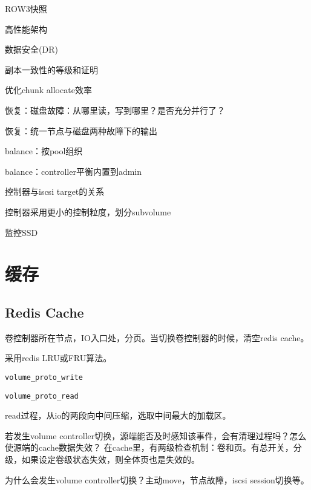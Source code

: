 \begin{enumbox}
\item ROW3快照
\item 高性能架构
\item 数据安全(DR)
\item 副本一致性的等级和证明
\item 优化chunk allocate效率
\item 恢复：磁盘故障：从哪里读，写到哪里？是否充分并行了？
\item 恢复：统一节点与磁盘两种故障下的输出
\item balance：按pool组织
\item balance：controller平衡内置到admin
\item 控制器与iscsi target的关系
\item 控制器采用更小的控制粒度，划分subvolume
\item 监控SSD
\end{enumbox}


\section{缓存}

\subsection{Redis Cache}

卷控制器所在节点，IO入口处，分页。当切换卷控制器的时候，清空redis cache。

采用redis LRU或FRU算法。

\begin{compactitem}
    \item \verb|volume_proto_write|
    \item \verb|volume_proto_read|
\end{compactitem}

read过程，从io的两段向中间压缩，选取中间最大的加载区。

若发生volume controller切换，源端能否及时感知该事件，会有清理过程吗？怎么使源端的cache数据失效？
在cache里，有两级检查机制：卷和页。有总开关，分级，如果设定卷级状态失效，则全体页也是失效的。

为什么会发生volume controller切换？主动move，节点故障，iscsi session切换等。

